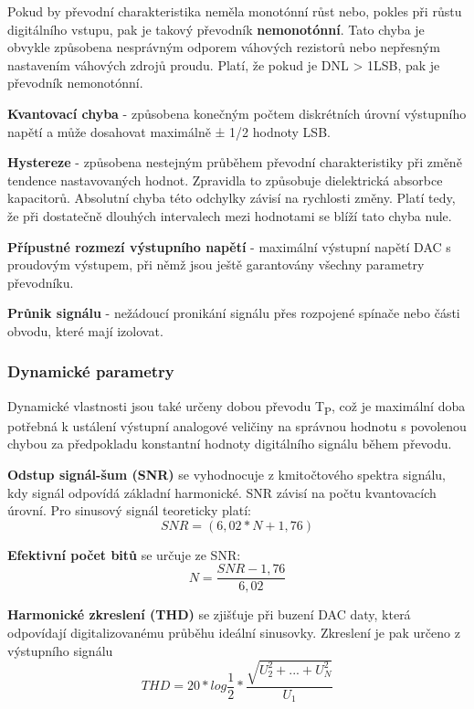 Pokud by převodní charakteristika neměla monotónní růst nebo, pokles při růstu digitálního vstupu, pak je takový převodník
\textbf{nemonotónní}. Tato chyba je obvykle způsobena nesprávným odporem váhových rezistorů nebo nepřesným nastavením váhových zdrojů proudu. Platí, že pokud je DNL > 1LSB, pak je převodník nemonotónní.

\textbf{Kvantovací chyba} - způsobena konečným počtem diskrétních úrovní výstupního napětí a může dosahovat maximálně ± 1/2 hodnoty LSB.

\textbf{Hystereze} - způsobena nestejným průběhem převodní charakteristiky při změně tendence nastavovaných hodnot.
Zpravidla to způsobuje dielektrická absorbce kapacitorů. Absolutní chyba této odchylky závisí na rychlosti změny. Platí
tedy, že při dostatečně dlouhých intervalech mezi hodnotami se blíží tato chyba nule.

\textbf{Přípustné rozmezí výstupního napětí} - maximální výstupní napětí DAC s proudovým výstupem, při němž jsou ještě
garantovány všechny parametry převodníku.

\textbf{Průnik signálu} - nežádoucí pronikání signálu přes rozpojené spínače nebo části obvodu, které mají izolovat.


\subsubsection{Dynamické parametry}
Dynamické vlastnosti jsou také určeny dobou převodu T\textsubscript{P}, což je maximální doba potřebná k ustálení výstupní analogové veličiny na správnou hodnotu s povolenou chybou za předpokladu konstantní hodnoty digitálního signálu během převodu.

\textbf{Odstup signál-šum (SNR)} se vyhodnocuje z kmitočtového spektra signálu, kdy signál odpovídá základní harmonické. SNR závisí na počtu kvantovacích úrovní. Pro sinusový signál teoreticky platí:
\begin{equation}
SNR=(6,02*N+1,76)
\end{equation}

\textbf{Efektivní počet bitů} se určuje ze SNR:
\begin{equation}
N=\frac{SNR-1,76}{6,02}
\end{equation}

\textbf{Harmonické zkreslení (THD)} se zjišťuje při buzení DAC daty, která odpovídají digitalizovanému průběhu ideální sinusovky. Zkreslení je pak určeno z výstupního signálu
\begin{equation}
THD=20*log\frac{1}{2}*\frac{\sqrt{U_{2}^2+...+U_{N}^2}}{U_{1}}
\end{equation}

